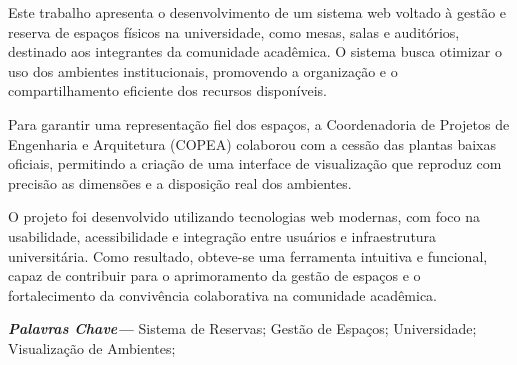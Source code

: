 Este trabalho apresenta o desenvolvimento de um sistema web voltado à gestão e reserva de espaços físicos na universidade, como mesas, salas e auditórios, destinado aos integrantes da comunidade acadêmica. O sistema busca otimizar o uso dos ambientes institucionais, promovendo a organização e o compartilhamento eficiente dos recursos disponíveis.

Para garantir uma representação fiel dos espaços, a Coordenadoria de Projetos de Engenharia e Arquitetura (COPEA) colaborou com a cessão das plantas baixas oficiais, permitindo a criação de uma interface de visualização que reproduz com precisão as dimensões e a disposição real dos ambientes.

O projeto foi desenvolvido utilizando tecnologias web modernas, com foco na usabilidade, acessibilidade e integração entre usuários e infraestrutura universitária. Como resultado, obteve-se uma ferramenta intuitiva e funcional, capaz de contribuir para o aprimoramento da gestão de espaços e o fortalecimento da convivência colaborativa na comunidade acadêmica. \hfill \break

\providecommand{\keywords}[1]{\textbf{\textit{Palavras Chave---}} #1}
\noindent\keywords{Sistema de Reservas; Gestão de Espaços; Universidade; Visualização de Ambientes;}
